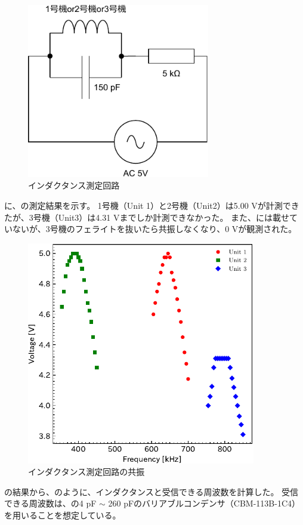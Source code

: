 \documentclass[report.tex]{subfiles}
\begin{document}
\begin{figure}[H]
	\centering
	\includegraphics[width=8cm]{fig/inda.pdf}
	\caption{インダクタンス測定回路}
	\label{fig:inda}
\end{figure}

に、の測定結果を示す。
1号機（Unit 1）と2号機（Unit2）は5.00 Vが計測できたが、3号機（Unit3）は4.31 Vまでしか計測できなかった。
また、には載せていないが、3号機のフェライトを抜いたら共振しなくなり、0 Vが観測された。

\begin{figure}[H]
	\centering
	\includegraphics[width=10cm]{fig/1_kyo.pdf}
	\caption{インダクタンス測定回路の共振}
	\label{fig:inda2}
\end{figure}

の結果から、のように、インダクタンスと受信できる周波数を計算した。
受信できる周波数は、の4 pF \(\sim\) 260 pFのバリアブルコンデンサ（CBM-113B-1C4）を用いることを想定している。
\end{document}
